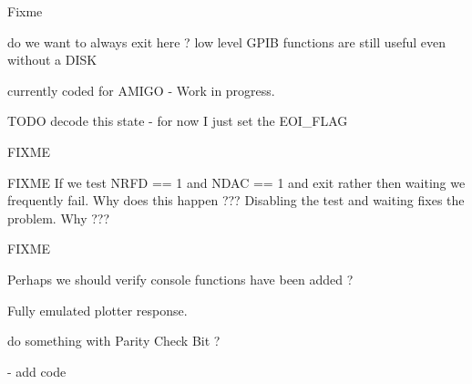 \begin{DoxyRefList}
Fixme  
\item[\label{todo__todo000014}%
\hypertarget{todo__todo000014}{}%
Global \hyperlink{gpib__task_8h_a903eb44d83bf8f2db71e6f32a35fec62}{gpib\+\_\+error\+\_\+test} (uint16\+\_\+t val)]do we want to always exit here ? low level G\+P\+IB functions are still useful even without a D\+I\+SK  
\item[\label{todo__todo000010}%
\hypertarget{todo__todo000010}{}%
Global \hyperlink{format_8c_a6897c56caeb4ebc5c5003c1f33a3b14c}{gpib\+\_\+format\+\_\+disk} (char $\ast$name, uint32\+\_\+t size)]currently coded for A\+M\+I\+GO -\/ Work in progress.  
\item[\label{todo__todo000013}%
\hypertarget{todo__todo000013}{}%
Global \hyperlink{gpib_8h_a67f7cdca85091b3eb0eea0051a200fbe}{gpib\+\_\+read\+\_\+str} (uint8\+\_\+t $\ast$buf, int size, uint16\+\_\+t $\ast$status)]T\+O\+DO decode this state -\/ for now I just set the E\+O\+I\+\_\+\+F\+L\+AG  
\item[\label{todo__todo000019}%
\hypertarget{todo__todo000019}{}%
Global \hyperlink{gpib__tests_8h_aed0c6a0a794f33d5cf7691c96d3e4955}{gpib\+\_\+tests} (char $\ast$str)]F\+I\+X\+ME  
\item[\label{todo__todo000011}%
\hypertarget{todo__todo000011}{}%
Global \hyperlink{gpib_8h_ac3d50cc1d56705d107e2f8fb00692e68}{gpib\+\_\+write\+\_\+byte} (uint16\+\_\+t ch)]F\+I\+X\+ME If we test N\+R\+FD == 1 and N\+D\+AC == 1 and exit rather then waiting we frequently fail. Why does this happen ??? Disabling the test and waiting fixes the problem. Why ??? 

F\+I\+X\+ME  
\item[\label{todo__todo000064}%
\hypertarget{todo__todo000064}{}%
Global \hyperlink{posix_8h_a31986cce890109c211ccb14151aafd0e}{isatty} (int fileno)]Perhaps we should verify console functions have been added ?  
\item[\label{todo__todo000020}%
\hypertarget{todo__todo000020}{}%
Global \hyperlink{printer_8h_a72686fe9d4969430b6ef1f1fe68a6efe}{P\+R\+I\+N\+T\+E\+R\+\_\+\+C\+O\+M\+M\+A\+N\+DS} (uint8\+\_\+t ch)]Fully emulated plotter response.  
\item[\label{todo__todo000060}%
\hypertarget{todo__todo000060}{}%
Global \hyperlink{ss80_8h_a9efbe3d75e86d4003a9fbf1c8cd69919}{S\+S80\+\_\+\+Amigo\+\_\+\+Clear} (void)]do something with Parity Check Bit ?  
\item[\label{todo__todo000061}%
\hypertarget{todo__todo000061}{}%
Global \hyperlink{ss80_8h_a21c26f6bd9041fecdeed562156b0ae92}{S\+S80\+\_\+\+Cancel} (int u)]-\/ add code 


\end{DoxyRefList}

